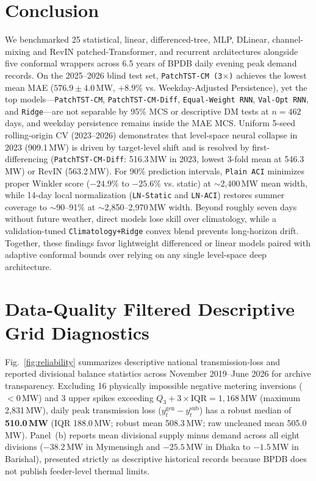 \documentclass[5p,twocolumn,authoryear]{elsarticle}
\begin{document}
\section{Conclusion}
We benchmarked 25 statistical, linear, differenced-tree, MLP, DLinear, channel-mixing and RevIN patched-Transformer, and recurrent architectures alongside five conformal wrappers across 6.5 years of BPDB daily evening peak demand records. On the 2025--2026 blind test set, \texttt{PatchTST-CM (3$\times$)} achieves the lowest mean MAE ($576.9 \pm 4.0$\,MW, $+8.9\%$ vs. Weekday-Adjusted Persistence), yet the top models---\texttt{PatchTST-CM}, \texttt{PatchTST-CM-Diff}, \texttt{Equal-Weight RNN}, \texttt{Val-Opt RNN}, and \texttt{Ridge}---are not separable by 95\% MCS or descriptive DM tests at $n=462$ days, and weekday persistence remains inside the MAE MCS. Uniform 5-seed rolling-origin CV (2023--2026) demonstrates that level-space neural collapse in 2023 (909.1\,MW) is driven by target-level shift and is resolved by first-differencing (\texttt{PatchTST-CM-Diff}: 516.3\,MW in 2023, lowest 3-fold mean at 546.3\,MW) or RevIN (563.2\,MW). For 90\% prediction intervals, \texttt{Plain ACI} minimizes proper Winkler score ($-24.9\%$ to $-25.6\%$ vs. static) at $\sim$2,400\,MW mean width, while 14-day local normalization (\texttt{LN-Static} and \texttt{LN-ACI}) restores summer coverage to $\sim$90--91\% at $\sim$2,850--2,970\,MW width. Beyond roughly seven days without future weather, direct models lose skill over climatology, while a validation-tuned \texttt{Climatology+Ridge} convex blend prevents long-horizon drift. Together, these findings favor lightweight differenced or linear models paired with adaptive conformal bounds over relying on any single level-space deep architecture.

\appendix
\section{Data-Quality Filtered Descriptive Grid Diagnostics}
Fig.~\ref{fig:reliability} summarizes descriptive national transmission-loss and reported divisional balance statistics across November 2019--June 2026 for archive transparency. Excluding 16 physically impossible negative metering inversions ($<0$\,MW) and 3 upper spikes exceeding $Q_3 + 3\times\text{IQR} = 1,168$\,MW (maximum 2,831\,MW), daily peak transmission loss ($y_t^{\text{gen}} - y_t^{\text{sub}}$) has a robust median of \textbf{510.0\,MW} (IQR 188.0\,MW; robust mean 508.3\,MW; raw uncleaned mean 505.0\,MW). Panel~(b) reports mean divisional supply minus demand across all eight divisions ($-38.2$\,MW in Mymensingh and $-25.5$\,MW in Dhaka to $-1.5$\,MW in Barishal), presented strictly as descriptive historical records because BPDB does not publish feeder-level thermal limits.
\end{document}
